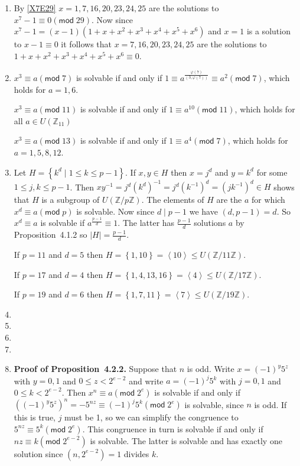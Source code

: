 \documentclass[12pt]{article}
\renewcommand{\pmod}[1]{\left(\mathsf{mod}\;#1\right)}
\begin{document}
\begin{enumerate}
\item %
By \autoref{X7E29}
$x=1,7,16,20,23,24,25$ are the solutions to $x^7-1\equiv 0\pmod{29}$.
Now since $x^7-1=\left(x-1\right)\left(1+x+x^2+x^3+x^4+x^5+x^6\right)$
and $x=1$ is a solution to $x-1\equiv 0$ it follows that
$x=7,16,20,23,24,25$ are the solutions to 
$1+x+x^2+x^3+x^4+x^5+x^6\equiv 0$.

\item %
$x^3\equiv a\pmod{7}$ is solvable if and only if
$1\equiv a^{\frac{\varphi\left(7\right)}
{\left(3,\varphi\left(7\right)\right)}}
\equiv a^2\pmod{7}$, which holds for $a=1,6$.

$x^3\equiv a\pmod{11}$ is solvable if and only if
$1 \equiv a^{10}\pmod{11}$, which holds for all
$a\in U\left(\mathbb{Z}_{11}\right)$

$x^3\equiv a\pmod{13}$ is solvable if and only if
$1\equiv
a^4\pmod{7}$, which holds for $a=1,5,8,12$.

\item %
Let $H=\left\{k^d\mid 1\le k\le p-1\right\}$.
If $x,y\in H$ then $x=j^d$ and $y=k^d$ for some $1\le j,k\le p-1$.
Then $xy^{-1}=j^d\left(k^d\right)^{-1}
=j^d\left(k^{-1}\right)^d=\left(jk^{-1}\right)^d\in H$
shows that $H$ is a subgroup of $U\left(\mathbb{Z}/p\mathbb{Z}\right)$.
The elements of $H$ are the $a$ for which $x^d\equiv a\pmod{p}$
is solvable. Now since $d\mid p-1$ we have $\left(d,p-1\right)=d$.
So $x^d\equiv a$ is solvable if $a^{\frac{p-1}{d}}\equiv 1$.
The latter has $\frac{p-1}{d}$ solutions $a$ by Proposition~4.1.2
so $\left|H\right|=\frac{p-1}{d}$.

If $p=11$ and $d=5$ then $H=\left\{1,10\right\}
=\left\langle 10\right\rangle\le U\left(\mathbb{Z}/11\mathbb{Z}\right)$.

If $p=17$ and $d=4$ then $H=\left\{1,4,13,16\right\}
=\left\langle 4\right\rangle\le U\left(\mathbb{Z}/17\mathbb{Z}\right)$.

If $p=19$ and $d=6$ then $H=\left\{1,7,11\right\}
=\left\langle 7\right\rangle\le U\left(\mathbb{Z}/19\mathbb{Z}\right)$.

\item %
\item %
\item %
\item %

\item %
{\bf Proof of Proposition~4.2.2.}
Suppose that $n$ is odd.
Write $x=\left(-1\right)^y5^z$ with $y=0,1$ and $0\le z<2^{e-2}$ and
write $a=\left(-1\right)^j5^k$ with $j=0,1$ and $0\le k<2^{e-2}$.
Then $x^n\equiv a\pmod{2^e}$ is solvable if and only if
$\left(\left(-1\right)^y5^z\right)^n=-5^{nz}
\equiv\left(-1\right)^j5^k\pmod{2^e}$ is solvable, since $n$ is odd.
If this is true, $j$ must be 1, so we can simplify the congruence
to $5^{nz}\equiv 5^k\pmod{2^e}$. This congruence in turn is solvable
if and only if $nz\equiv k\pmod{2^{e-2}}$ is solvable. The latter
is solvable and has exactly one solution
since $\left(n,2^{e-2}\right)=1$ divides $k$.


\end{enumerate}
\end{document}
